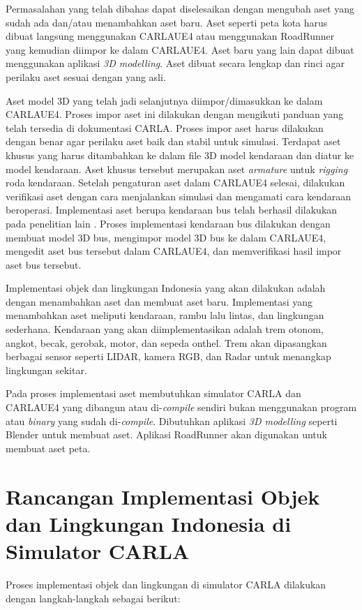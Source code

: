 Permasalahan yang telah dibahas dapat diselesaikan dengan mengubah aset yang
sudah ada dan/atau menambahkan aset baru. Aset seperti peta kota harus dibuat
langsung menggunakan CARLAUE4 atau menggunakan RoadRunner yang kemudian diimpor
ke dalam CARLAUE4. Aset baru yang lain dapat dibuat menggunakan aplikasi
\textit{3D modelling}. Aset dibuat secara lengkap dan rinci agar perilaku aset
sesuai dengan yang asli.

Aset model 3D yang telah jadi selanjutnya diimpor/dimasukkan ke dalam CARLAUE4.
Proses impor aset ini dilakukan dengan mengikuti panduan yang telah tersedia di
dokumentasi CARLA. Proses impor aset harus dilakukan dengan benar agar perilaku
aset baik dan stabil untuk simulasi. Terdapat aset khusus yang harus ditambahkan
ke dalam file 3D model kendaraan dan diatur ke model kendaraan. Aset khusus
tersebut merupakan aset \textit{armature} untuk \textit{rigging} roda kendaraan.
Setelah pengaturan aset dalam CARLAUE4 selesai, dilakukan verifikasi aset dengan
cara menjalankan simulasi dan mengamati cara kendaraan beroperasi. Implementasi
aset berupa kendaraan bus telah berhasil dilakukan pada penelitian lain
\parencite{related-work-xiang}. Proses implementasi kendaraan bus dilakukan
dengan membuat model 3D bus, mengimpor model 3D bus ke dalam CARLAUE4, mengedit
aset bus tersebut dalam CARLAUE4, dan memverifikasi hasil impor aset bus
tersebut.

Implementasi objek dan lingkungan Indonesia yang akan dilakukan adalah dengan
menambahkan aset dan membuat aset baru. Implementasi yang menambahkan aset
meliputi kendaraan, rambu lalu lintas, dan lingkungan sederhana. Kendaraan yang
akan diimplementasikan adalah trem otonom, angkot, becak, gerobak, motor, dan
sepeda onthel. Trem akan dipasangkan berbagai sensor seperti LIDAR, kamera RGB,
dan Radar untuk menangkap lingkungan sekitar.

Pada proses implementasi aset membutuhkan simulator CARLA dan CARLAUE4 yang
dibangun atau di-\textit{compile} sendiri bukan menggunakan program atau
\textit{binary} yang sudah di-\textit{compile}. Dibutuhkan aplikasi \textit{3D
modelling} seperti Blender untuk membuat aset. Aplikasi RoadRunner akan
digunakan untuk membuat aset peta.

\section{Rancangan Implementasi Objek dan Lingkungan Indonesia di Simulator CARLA}

Proses implementasi objek dan lingkungan di simulator CARLA dilakukan dengan
langkah-langkah sebagai berikut:

